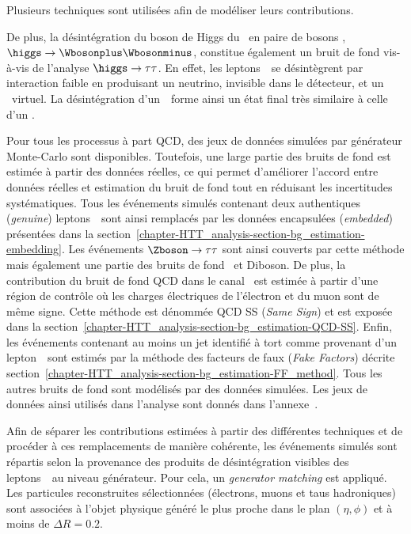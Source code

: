 Plusieurs techniques sont utilisées afin de modéliser leurs contributions.
\par
De plus, la désintégration du boson de Higgs du \SM\ en paire de bosons \Wboson, $\higgs\to\Wbosonplus\Wbosonminus$, constitue également un bruit de fond vis-à-vis de l'analyse $\higgs\to\tau\tau$.
En effet, les leptons~\tau\ se désintègrent par interaction faible en produisant un neutrino, invisible dans le détecteur, et un \Wboson\ virtuel.
La désintégration d'un~\tau\ forme ainsi un état final très similaire à celle d'un \Wboson.
\par
Pour tous les processus à part QCD, des jeux de données simulées par générateur Monte-Carlo sont disponibles.
Toutefois, une large partie des bruits de fond est estimée à partir des données réelles, ce qui permet d'améliorer l'accord entre données réelles et estimation du bruit de fond tout en réduisant les incertitudes systématiques.
Tous les événements simulés contenant deux authentiques (\emph{genuine}) leptons~\tau\ sont ainsi remplacés par les données encapsulées (\emph{embedded}) présentées dans la section~\ref{chapter-HTT_analysis-section-bg_estimation-embedding}.
Les événements $\Zboson\to\tau\tau$ sont ainsi couverts par cette méthode mais également une partie des bruits de fond \ttbar\ et Diboson.
De plus, la contribution du bruit de fond QCD dans le canal \ele\mu\ est estimée à partir d'une région de contrôle où les charges électriques de l'électron et du muon sont de même signe.
Cette méthode est dénommée \og QCD SS \fg{} (\emph{Same Sign}) et est exposée dans la section~\ref{chapter-HTT_analysis-section-bg_estimation-QCD-SS}.
Enfin, les événements contenant au moins un jet identifié à tort comme provenant d'un lepton~\tau\ sont estimés par la méthode des facteurs de faux (\emph{Fake Factors}) décrite section~\ref{chapter-HTT_analysis-section-bg_estimation-FF_method}.
Tous les autres bruits de fond sont modélisés par des données simulées.
Les jeux de données ainsi utilisés dans l'analyse sont donnés dans l'annexe~.
\par
Afin de séparer les contributions estimées à partir des différentes techniques et de procéder à ces remplacements de manière cohérente, les événements simulés sont répartis selon la provenance des produits de désintégration visibles des leptons~\tau\ au niveau générateur.
Pour cela, un \emph{generator matching} est appliqué.
Les particules reconstruites sélectionnées (électrons, muons et taus hadroniques) sont associées à l'objet physique généré le plus proche dans le plan $(\eta, \phi)$ et à moins de $\Delta R = \num{0.2}$.
